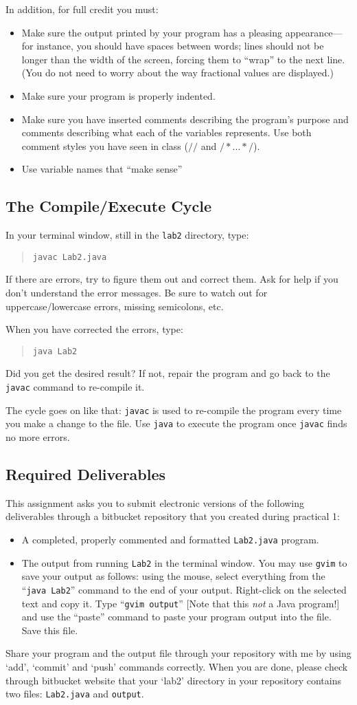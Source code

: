 \noindent In addition, for full credit you must:
\begin{itemize}
\item
Make sure the output printed by your program has a
pleasing appearance---for instance, you should have spaces between words;
lines should not be longer than the width of the screen, forcing them to ``wrap''
to the next line. (You do not need to worry about the way
fractional values are displayed.)
\item
Make sure your program is properly indented.
\item
Make sure you have inserted comments describing the program's purpose and
comments describing what each of the variables represents. Use both comment styles you have seen in class ($//$ and $/* ...   */$).
\item
Use variable names that ``make sense''
\end{itemize}


\subsection*{The Compile/Execute Cycle}
In your terminal window, still in the {\tt lab2} directory, type:
\begin{quote}
{\tt javac Lab2.java} 
\end{quote}
If there are errors, try to figure them out and correct them. Ask for help if
you don't understand the error messages. Be sure to watch out for
uppercase/lowercase errors, missing semicolons, etc.

When you have corrected the errors, type:
\begin{quote}
{\tt java Lab2}
\end{quote}
Did you get the desired result? If not, repair the program and go back to
the {\tt javac} command to re-compile it.

The cycle goes on like that: {\tt javac} is used to re-compile the
program every time you make a change
to the file. Use {\tt java} to execute the program once {\tt javac}
finds no more errors.

\subsection*{Required Deliverables}
This assignment asks you to submit electronic versions of the following deliverables through
a bitbucket repository that you created during practical 1: 
\begin{itemize}
	\item A completed, properly commented and formatted {\tt Lab2.java} program.
	\item The output from running {\tt Lab2} in the terminal window. You may use {\tt gvim} to save
	your output as follows: using the mouse,
select everything from the ``{\tt java Lab2}'' command to the end of your output.
Right-click on the selected text and copy it.
Type ``{\tt gvim output}'' [Note that this {\em not} a Java program!]
and use the ``paste'' command to paste your program output into the file.
 Save this file.
\end{itemize}

Share your program and the output file through your repository with me by using `add', `commit' and `push' commands correctly. When you are done, please check through bitbucket website that your `lab2' directory in your repository contains two files: {\tt Lab2.java} and {\tt output}.


